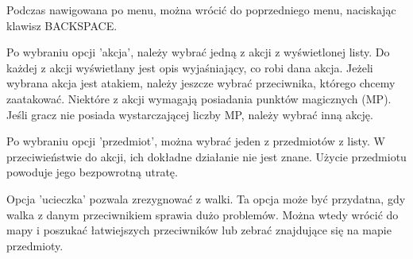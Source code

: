 Podczas nawigowana po menu, można wrócić do poprzedniego menu, naciskając 
klawisz BACKSPACE.

Po wybraniu opcji 'akcja', należy wybrać jedną z akcji z wyświetlonej listy.
Do każdej z akcji wyświetlany jest opis wyjaśniający, co robi dana akcja.
Jeżeli wybrana akcja jest atakiem, należy jeszcze wybrać przeciwnika, którego 
chcemy zaatakować.
Niektóre z akcji wymagają posiadania punktów magicznych (MP).
Jeśli gracz nie posiada wystarczającej liczby MP, należy wybrać inną akcję.

Po wybraniu opcji 'przedmiot', można wybrać jeden z przedmiotów z listy.
W przeciwieństwie do akcji, ich dokładne działanie nie jest znane.
Użycie przedmiotu powoduje jego bezpowrotną utratę.

Opcja 'ucieczka' pozwala zrezygnować z walki. Ta opcja może być przydatna, gdy 
walka z danym przeciwnikiem sprawia dużo problemów. Można wtedy wrócić do mapy 
i poszukać łatwiejszych przeciwników lub zebrać znajdujące się na mapie 
przedmioty.